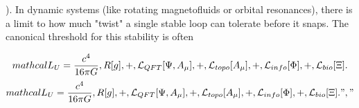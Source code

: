 
\begin{tzpsnapshot}
\end{tzpsnapshot}

). In dynamic systems (like rotating magnetofluids or orbital resonances), there is a limit to how much "twist" a single stable loop can tolerate before it snaps. The canonical threshold for this stability is often

\[
mathcal{L}_U = \frac{c^4}{16\pi G}\\,R[g] \\, + \\, \mathcal{L}_{QFT}[\Psi, A_\mu] \\, + \\, \mathcal{L}_{topo}[A_\mu] \\, + \\, \mathcal{L}_{info}[\Phi] \\, + \\, \mathcal{L}_{bio}[\Xi].
\]
\[
mathcal{L}_U = \frac{c^4}{16\pi G}\\,R[g] \\, + \\, \mathcal{L}_{QFT}[\Psi, A_\mu] \\, + \\, \mathcal{L}_{topo}[A_\mu] \\, + \\, \mathcal{L}_{info}[\Phi] \\, + \\, \mathcal{L}_{bio}[\Xi].","
\]

